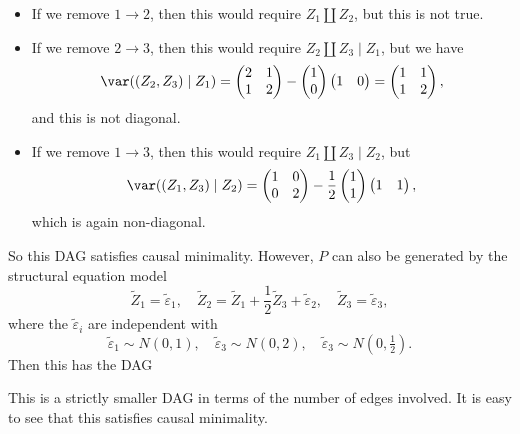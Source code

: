 \documentclass[a4paper]{article}
\begin{document}
\begin{itemize}
  \item If we remove $1 \to 2$, then this would require $Z_1 \amalg Z_2$, but this is not true.
  \item If we remove $2 \to 3$, then this would require $Z_2 \amalg Z_3 \mid Z_1$, but we have
    \[
      \var((Z_2, Z_3) \mid Z_1) =
      \begin{pmatrix}
        2 & 1\\
        1 & 2
      \end{pmatrix} -
      \begin{pmatrix}
        1 \\0
      \end{pmatrix}
      \begin{pmatrix}
        1 & 0
      \end{pmatrix} =
      \begin{pmatrix}
        1 & 1\\
        1 & 2
      \end{pmatrix},
    \]
    and this is not diagonal.
  \item If we remove $1 \to 3$, then this would require $Z_1 \amalg Z_3 \mid Z_2$, but
    \[
     \var((Z_1, Z_3) \mid Z_2) =
     \begin{pmatrix}
       1 & 0 \\
       0 & 2
     \end{pmatrix} -
     \frac{1}{2}
     \begin{pmatrix}
       1 \\ 1
     \end{pmatrix}
     \begin{pmatrix}
       1 & 1
     \end{pmatrix},
   \]
   which is again non-diagonal.
\end{itemize}
So this DAG satisfies causal minimality. However, $P$ can also be generated by the structural equation model
\[
  \tilde{Z}_1 = \tilde{\varepsilon}_1,\quad \tilde{Z}_2 = \tilde{Z}_1 + \frac{1}{2} \tilde{Z}_3 + \tilde{\varepsilon}_2,\quad \tilde{Z}_3 = \tilde{\varepsilon}_3,
\]
where the $\tilde{\varepsilon}_i$ are independent with
\[
  \tilde{\varepsilon}_1 \sim N(0, 1),\quad \tilde{\varepsilon}_3 \sim N(0, 2),\quad \tilde{\varepsilon}_3 \sim N(0, \tfrac{1}{2}).
\]
Then this has the DAG
\begin{center}
\end{center}
This is a strictly smaller DAG in terms of the number of edges involved. It is easy to see that this satisfies causal minimality.
\end{document}
